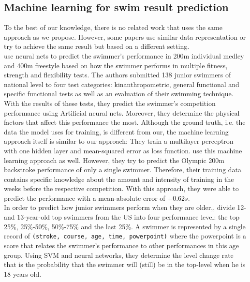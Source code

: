 \subsection{Machine learning for swim result prediction}
To the best of our knowledge, there is no related work that uses the same approach as we propose. However, some papers use similar data representation or try to achieve the same result but based on a different setting.\\
\citet{Silva.2007} use neural nets to predict the swimmer’s performance in 200m individual medley and 400m freestyle based on how the swimmer performs in multiple fitness, strength and flexibility tests. The authors submitted 138 junior swimmers of national level to four test categories: kinanthropometric, general functional and specific functional tests as well as an evaluation of their swimming technique. With the results of these tests, they predict the swimmer’s competition performance using Artificial neural nets. Moreover, they determine the physical factors that affect this performance the most. Although the ground truth, i.e. the data the model uses for training, is different from our, the machine learning approach itself is similar to our approach: They train a multilayer perceptron with one hidden layer and mean-squared error as loss function. \citet{EdelmannNusser.2002} use this machine learning approach as well. However, they try to predict the Olympic 200m backstroke performance of only a single swimmer. Therefore, their training data contains specific knowledge about the amount and intensity of training in the weeks before the respective competition. With this approach, they were able to predict the performance with a mean-absolute error of $\pm 0.62s$.\\
In order to predict how junior swimmers perform when they are older,, \citet{Xie.2015} divide 12- and 13-year-old top swimmers from the US into four performance level: the top 25\%, 25\%-50\%, 50\%-75\% and the last 25\%. A swimmer is represented by a single record of \texttt{(stroke, course, age, time, powerpoint)} where the powerpoint is a score that relates the swimmer's performance to other performances in this age group. Using SVM and neural networks, they determine the level change rate that is the probability that the swimmer will (still) be in the top-level when he is 18 years old. 